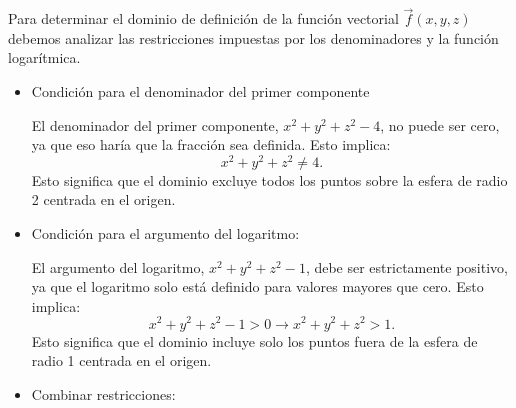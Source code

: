\begin{enumerate}[label=\color{red}\textbf{\arabic*)}, leftmargin=*]
\begin{enumerate}[label=\color{red}\textbf{\alph*)}]
Para determinar el dominio de definición de la función vectorial $\vec{f}(x,y,z)$ debemos analizar las restricciones impuestas por los denominadores y la función logarítmica.

\begin{itemize}
\item Condición para el denominador del primer componente

El denominador del primer componente, $x^2+y^2+z^2-4$, no puede ser cero, ya que eso haría que la fracción sea definida. Esto implica: $$x^2+y^2+z^2\neq4.$$ Esto significa que el dominio excluye todos los puntos sobre la esfera de radio 2 centrada en el origen.

\item Condición para el argumento del logaritmo:

El argumento del logaritmo, $x^2+y^2+z^2-1$, debe ser estrictamente positivo, ya que el logaritmo solo está definido para valores mayores que cero. Esto implica: $$x^2+y^2+z^2-1>0\longrightarrow x^2+y^2+z^2>1.$$ Esto significa que el dominio incluye solo los puntos fuera de la esfera de radio 1 centrada en el origen.

\item Combinar restricciones:


\end{itemize}
\end{enumerate}
\end{enumerate}
